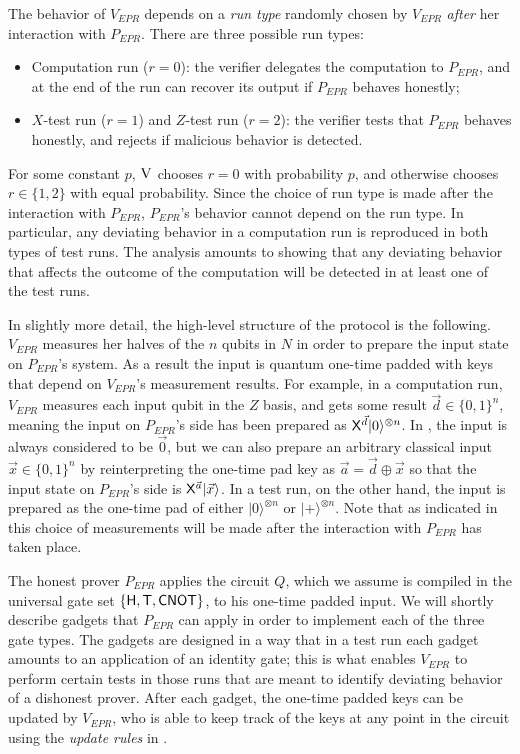 \documentclass{toc}
\newcommand{\ket}[1]{|#1\rangle}
\newcommand{\ver}{\textsc{V}}
\begin{document}
The behavior of $V_{EPR}$ depends on a \emph{run type} randomly chosen by $V_{EPR}$ \emph{after} her interaction with $P_{EPR}$. There are three possible run types:
\begin{itemize}[nolistsep]
\item Computation run ($r=0$): the verifier delegates the computation to $P_{EPR}$, and at the end of the run can recover its output if $P_{EPR}$ behaves honestly;
\item $X$-test run ($r=1$) and $Z$-test run ($r=2$): the verifier tests that  $P_{EPR}$  behaves honestly, and rejects if malicious behavior is detected.
\end{itemize}
For some constant $p$, $\ver$ chooses $r=0$ with probability $p$, and otherwise chooses $r\in\{1,2\}$ with equal probability. Since the choice of run type is made after the interaction with $P_{EPR}$, $P_{EPR}$'s behavior cannot depend on the run type. In particular, any deviating behavior in a computation run is reproduced in both types of test runs. The analysis amounts to showing that any deviating behavior that affects the outcome of the computation will be detected in at least one of the test runs. 

In slightly more detail, the high-level structure of the protocol is the following. $V_{EPR}$ measures her halves of the $n$ qubits in $N$ in order to prepare the input state on $P_{EPR}$'s system. As a result the input is quantum one-time padded with keys that depend on $V_{EPR}$'s measurement results. For example, in a computation run, $V_{EPR}$ measures each input qubit in the $Z$ basis, and gets some result $\vec{d}\in\{0,1\}^n$, meaning the input on $P_{EPR}$'s side has been prepared as ${\sf X}^{\vec{d}}\ket{0}^{\otimes n}$. In \cite{broadbent15howtoverify}, the input is always considered to be $\vec{0}$, but we can also prepare an arbitrary classical input $\vec{x}\in\{0,1\}^n$ by reinterpreting the one-time pad key as $\vec{a}=\vec{d}\oplus \vec{x}$ so that the input state on $P_{EPR}$'s side is ${\sf X}^{\vec{a}}\ket{\vec{x}}$. In a test run, on the other hand, the input is prepared as the one-time pad of either $\ket{0}^{\otimes n}$ or $\ket{+}^{\otimes n}$. Note that as indicated in  this choice of measurements will be made after the interaction with $P_{EPR}$ has taken place.

The honest prover $P_{EPR}$ applies the circuit $Q$, which we assume is compiled in the universal gate set $\{{\sf H},{\sf T},{\sf CNOT}\}$, to his one-time padded input. We will shortly describe gadgets that $P_{EPR}$ can apply in order to implement each of the three gate types. The gadgets are designed in a way that in a test run each gadget amounts to an application of an identity gate; this is what enables $V_{EPR}$ to perform certain tests in those runs that are meant to identify deviating behavior of a dishonest prover. After each gadget, the one-time padded keys can be updated by $V_{EPR}$, who is able to keep track of the keys at any point in the circuit using the \emph{update rules} in . 
\end{document}
